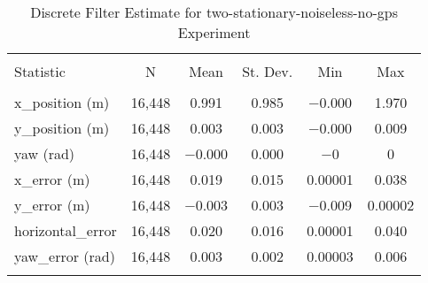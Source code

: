 
\begin{table}[h] \centering 
  \caption{Discrete Filter Estimate for two-stationary-noiseless-no-gps Experiment} 
  \label{tab:two_stationary_noiseless_no_gps_discrete_summary} 
\begin{tabular}{@{\extracolsep{5pt}}lccccc} 
\\[-1.8ex]\hline 
\hline \\[-1.8ex] 
Statistic & \multicolumn{1}{c}{N} & \multicolumn{1}{c}{Mean} & \multicolumn{1}{c}{St. Dev.} & \multicolumn{1}{c}{Min} & \multicolumn{1}{c}{Max} \\ 
\hline \\[-1.8ex] 
x\_position (m) & 16,448 & \num{0.991} & \num{0.985} & \num{-0.000} & \num{1.970} \\ 
y\_position (m) & 16,448 & \num{0.003} & \num{0.003} & \num{-0.000} & \num{0.009} \\ 
yaw (rad) & 16,448 & \num{-0.000} & \num{0.000} & $-$0 & 0 \\ 
x\_error (m) & 16,448 & \num{0.019} & \num{0.015} & \num{0.00001} & \num{0.038} \\ 
y\_error (m) & 16,448 & \num{-0.003} & \num{0.003} & \num{-0.009} & \num{0.00002} \\ 
horizontal\_error & 16,448 & \num{0.020} & \num{0.016} & \num{0.00001} & \num{0.040} \\ 
yaw\_error (rad) & 16,448 & \num{0.003} & \num{0.002} & \num{0.00003} & \num{0.006} \\ 
\hline \\[-1.8ex] 
\end{tabular} 
\end{table} 
